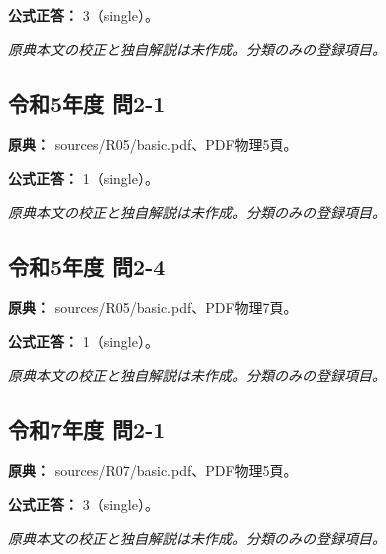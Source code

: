 \textbf{公式正答：} 3（single）。

\par\textit{原典本文の校正と独自解説は未作成。分類のみの登録項目。}

\subsection{令和5年度 問2-1}
\label{q:r05-reg-basic-2-1}

\noindent\textbf{原典：} sources/R05/basic.pdf、PDF物理5頁。

\textbf{公式正答：} 1（single）。

\par\textit{原典本文の校正と独自解説は未作成。分類のみの登録項目。}

\subsection{令和5年度 問2-4}
\label{q:r05-reg-basic-2-4}

\noindent\textbf{原典：} sources/R05/basic.pdf、PDF物理7頁。

\textbf{公式正答：} 1（single）。

\par\textit{原典本文の校正と独自解説は未作成。分類のみの登録項目。}

\subsection{令和7年度 問2-1}
\label{q:r07-reg-basic-2-1}

\noindent\textbf{原典：} sources/R07/basic.pdf、PDF物理5頁。

\textbf{公式正答：} 3（single）。

\par\textit{原典本文の校正と独自解説は未作成。分類のみの登録項目。}
